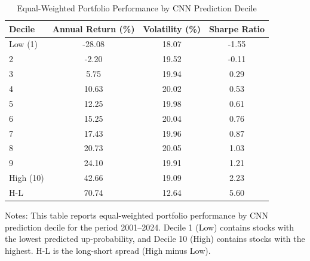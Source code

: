 \begin{table}[htbp]
    \centering
    \caption{Equal-Weighted Portfolio Performance by CNN Prediction Decile}
    \label{tab:portfolio_ew_template}
    \begin{threeparttable}
    \begin{tabular}{l
                    S[table-format=-2.2]
                    S[table-format=2.2]
                    S[table-format=-1.2]}
        \toprule
        {Decile} & {Annual Return (\%)} & {Volatility (\%)} & {Sharpe Ratio} \\
        \midrule
        Low (1) & -28.08 & 18.07 & -1.55 \\
        2 & -2.20 & 19.52 & -0.11 \\
        3 & 5.75 & 19.94 & 0.29 \\
        4 & 10.63 & 20.02 & 0.53 \\
        5 & 12.25 & 19.98 & 0.61 \\
        6 & 15.25 & 20.04 & 0.76 \\
        7 & 17.43 & 19.96 & 0.87 \\
        8 & 20.73 & 20.05 & 1.03 \\
        9 & 24.10 & 19.91 & 1.21 \\
        High (10) & 42.66 & 19.09 & 2.23 \\
        \midrule
        H-L & 70.74 & 12.64 & 5.60 \\
        \bottomrule
    \end{tabular}
    \begin{tablenotes}
        \footnotesize
        \item Notes: This table reports equal-weighted portfolio performance by CNN prediction decile
        for the period 2001--2024. Decile 1 (Low) contains stocks with the lowest predicted up-probability,
        and Decile 10 (High) contains stocks with the highest. H-L is the long-short spread (High minus Low).
    \end{tablenotes}
    \end{threeparttable}
\end{table}

